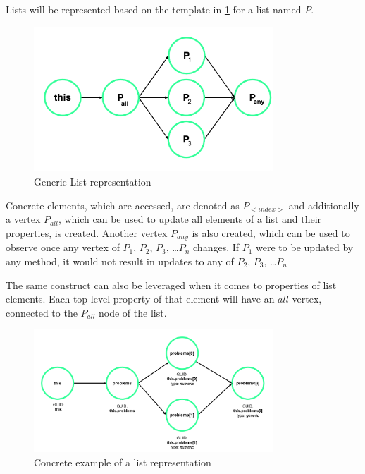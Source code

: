 Lists will be represented based on the template in \ref{fig:graph_list_generic} for a list named $P$.  %
\begin{figure}[H]
    \includegraphics[width=0.8\textwidth]{images/graph_list_generic.png}
     \caption{Generic List representation}
     \label{fig:graph_list_generic}
\end{figure}

Concrete elements, which are accessed, are denoted as $P_{<index>}$ and additionally a vertex $P_{all}$, which can be used to update all elements of a list\label{concept:why_create_list} and their properties, is created. Another vertex $P_{any}$ is also created, which can be used to observe once any vertex of $P_1$, $P_2$, $P_3$, \dots $P_n$ changes. If $P_1$ were to be updated by any method, it would not result in updates to any of $P_2$, $P_3$, \dots $P_n$

The same construct can also be leveraged when it comes to properties of list elements. Each top level property of that element will have an $all$ vertex, connected to the $P_{all}$ node of the list.  

\begin{figure}[H]
    \includegraphics[width=0.8\textwidth]{images/graph_list.png}
     \caption{Concrete example of a list representation}
     \label{fig:graph_list}
\end{figure}

